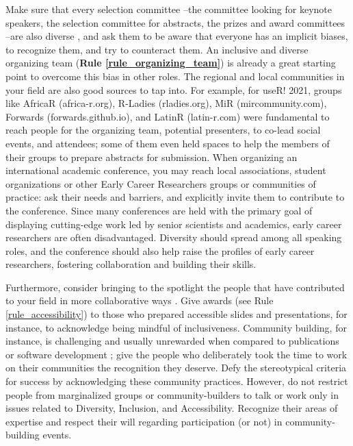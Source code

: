 \documentclass[10pt,letterpaper]{article}
\begin{document}
Make sure that every selection committee --the committee looking for keynote speakers, the selection committee for abstracts, the prizes and award committees --are also diverse \cite{swartzScienceValueDiversity2019, wongBuildDiversityScience2020}, and ask them to be aware that everyone has an implicit biases, to recognize them, and try to counteract them.  An inclusive and diverse organizing team (\textbf{Rule \ref{rule_organizing_team}}) is already a great starting point to overcome this bias in other roles. The regional and local communities in your field are also good sources to tap into. 
For example, for useR! 2021, groups like AfricaR (africa-r.org), R-Ladies (rladies.org), MiR (mircommunity.com), Forwards (forwards.github.io), and LatinR (latin-r.com) were fundamental to reach people for the organizing team, potential presenters, to co-lead social events, and attendees; some of them even held spaces to help the members of their groups to prepare abstracts for submission.
When organizing an international academic conference, you may reach local associations, student organizations or other Early Career Researchers groups or communities of practice: ask their needs and barriers, and explicitly invite them to contribute to the conference. Since many conferences are held with the primary goal of displaying cutting-edge work led by senior scientists and academics, early career researchers are often disadvantaged. Diversity should spread among all speaking roles, and the conference should also help raise the profiles of early career researchers, fostering collaboration and building their skills.

Furthermore, consider bringing to the spotlight the people that have contributed to your field in more collaborative  ways \cite{cheng2020x+}. Give awards (see Rule \ref{rule_accessibility}) to those who prepared accessible slides and presentations, for instance, to acknowledge being mindful of inclusiveness. Community building, for instance, is challenging and usually unrewarded when compared to publications or software development \cite{acionWhyChooseCommunity2020}; give the people who deliberately took the time to work on their communities the recognition they deserve. Defy the stereotypical criteria for success by acknowledging these community practices. 
However, do not restrict people from marginalized groups or community-builders to talk or work only in issues related to Diversity, Inclusion, and Accessibility. Recognize their areas of expertise and respect their will regarding participation (or not) in community-building events.
\end{document}
